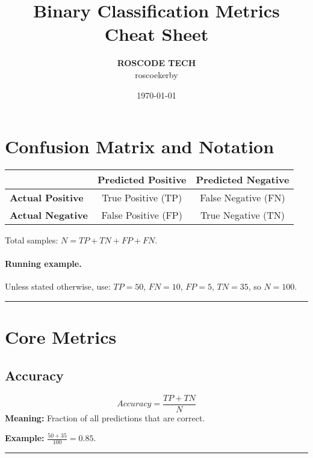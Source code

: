 \documentclass[a4paper,11pt]{article}
\title{\vspace{-2cm}\textbf{\LARGE Binary Classification Metrics Cheat Sheet}}
\author{\textbf{ROSCODE TECH}\\[0.25em]\small roscoekerby}
\date{\today}
\newcommand{\exline}{\vspace{0.35em}\hrule\vspace{0.6em}}
\newcommand{\metric}[4]{%
\subsection*{#1}
\[
#2
\]
\noindent\textbf{Meaning:} #3

\vspace{0.8em}

\noindent\textbf{Example:} #4

\exline
}
\begin{document}
\maketitle
\thispagestyle{empty}
\vfill
\begin{center}
\end{center}
\vfill
\newpage

\tableofcontents
\newpage

\section{Confusion Matrix and Notation}

\begin{center}
\renewcommand{\arraystretch}{1.25}
\begin{tabular}{@{}lcc@{}}
\toprule
 & \textbf{Predicted Positive} & \textbf{Predicted Negative} \\
\midrule
\textbf{Actual Positive} & True Positive (TP) & False Negative (FN) \\
\textbf{Actual Negative} & False Positive (FP) & True Negative (TN) \\
\bottomrule
\end{tabular}
\end{center}

\noindent Total samples: \(N = TP + TN + FP + FN\).

\paragraph{Running example.}
Unless stated otherwise, use: \(TP=50\), \(FN=10\), \(FP=5\), \(TN=35\), so \(N=100\).

\exline

\section{Core Metrics}

\metric{Accuracy}{\displaystyle Accuracy=\frac{TP+TN}{N}}{Fraction of all predictions that are correct.}{\(\frac{50+35}{100}=0.85\).}
\end{document}
